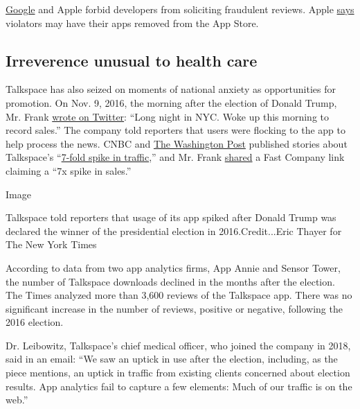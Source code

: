 \href{https://support.google.com/googleplay/android-developer/answer/9898684}{Google}
and Apple forbid developers from soliciting fraudulent reviews. Apple
\href{https://developer.apple.com/app-store/review/guidelines/}{says}
violators may have their apps removed from the App Store.

\hypertarget{irreverence-unusual-to-health-care}{%
\subsection{Irreverence unusual to health
care}\label{irreverence-unusual-to-health-care}}

Talkspace has also seized on moments of national anxiety as
opportunities for promotion. On Nov. 9, 2016, the morning after the
election of Donald Trump, Mr. Frank
\href{https://twitter.com/orenfrank/status/796362326073081856}{wrote on
Twitter}: ``Long night in NYC. Woke up this morning to record sales.''
The company told reporters that users were flocking to the app to help
process the news. CNBC and
\href{https://www.washingtonpost.com/news/on-small-business/wp/2016/11/17/trumps-victory-is-proving-to-be-great-newsif-youre-in-the-therapy-business/}{The
Washington Post} published stories about Talkspace's
``\href{https://www.cnbc.com/2016/11/14/online-therapy-startup-sees-a-7-fold-spike-in-traffic-after-trump-victory.html}{7-fold
spike in traffic},'' and Mr. Frank
\href{https://twitter.com/orenfrank/status/796446638923513857}{shared} a
Fast Company link claiming a ``7x spike in sales.''

Image

Talkspace told reporters that usage of its app spiked after Donald Trump
was declared the winner of the presidential election in
2016.Credit...Eric Thayer for The New York Times

According to data from two app analytics firms, App Annie and Sensor
Tower, the number of Talkspace downloads declined in the months after
the election. The Times analyzed more than 3,600 reviews of the
Talkspace app. There was no significant increase in the number of
reviews, positive or negative, following the 2016 election.

Dr. Leibowitz, Talkspace's chief medical officer, who joined the company
in 2018, said in an email: ``We saw an uptick in use after the election,
including, as the piece mentions, an uptick in traffic from existing
clients concerned about election results. App analytics fail to capture
a few elements: Much of our traffic is on the web.''

